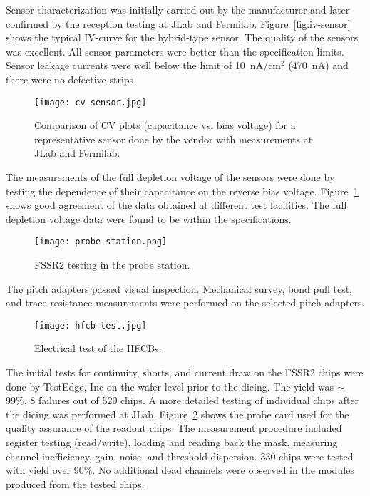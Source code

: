 Sensor characterization was initially carried out by the manufacturer and later confirmed by the reception testing
at JLab and Fermilab. Figure~\ref{fig:iv-sensor} shows the typical IV-curve for the hybrid-type sensor. The quality
of the sensors was excellent. All sensor parameters were better than the specification limits. Sensor leakage
currents were well below the limit of 10~nA/cm$^2$ (470~nA) and there were no defective strips. 

\begin{figure}[h] 
\centering 
\texttt{[image: cv-sensor.jpg]}
\caption{Comparison of CV plots (capacitance vs. bias voltage) for a representative sensor done by the vendor with
  measurements at JLab and Fermilab.}
\label{fig:cv-sensor}
\end{figure}

The measurements of the full depletion voltage of the sensors were done by testing the dependence of their 
capacitance on the reverse bias voltage. Figure~\ref{fig:cv-sensor} shows good agreement of the data obtained at
different test facilities. The full depletion voltage data were found to be within the specifications. 

\begin{figure}[h] 
\centering 
\texttt{[image: probe-station.png]}
\caption{FSSR2 testing in the probe station.}
\label{fig:probe-station}
\end{figure}

The pitch adapters passed visual inspection. Mechanical survey, bond pull test, and trace resistance measurements
were performed on the selected pitch adapters.

\begin{figure}[h] 
\centering 
\texttt{[image: hfcb-test.jpg]}
\caption{Electrical test of the HFCBs.}
\label{fig:hfcb-test}
\end{figure}

The initial tests for continuity, shorts, and current draw on the FSSR2 chips were done by TestEdge, Inc on the wafer
level prior to the dicing. The yield was $\sim$99\%, 8 failures out of 520 chips. A more detailed testing of
individual chips after the dicing was performed at JLab.  Figure~\ref{fig:probe-station} shows the probe card used
for the quality assurance of the readout chips. The measurement procedure included register testing (read/write),
loading and reading back the mask, measuring channel inefficiency, gain, noise, and threshold dispersion. 330 chips
were tested with yield over 90\%. No additional dead channels were observed in the modules produced from
the tested chips.  

